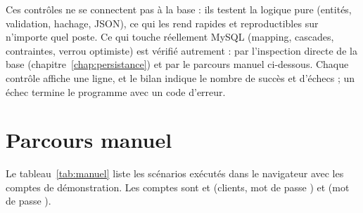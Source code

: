 Ces contrôles ne se connectent pas à la base : ils testent la logique pure (entités, validation, hachage, JSON), ce qui les rend
rapides et reproductibles sur n'importe quel poste. Ce qui touche réellement MySQL (mapping, cascades, contraintes, verrou optimiste) est
vérifié autrement : par l'inspection directe de la base (chapitre~\ref{chap:persistance}) et par le parcours manuel ci-dessous.
Chaque contrôle affiche une ligne, et le bilan indique le nombre de succès et d'échecs ; un échec termine le programme avec un code
d'erreur.


\section{Parcours manuel}
Le tableau~\ref{tab:manuel} liste les scénarios exécutés dans le navigateur avec les comptes de démonstration. Les comptes
sont  et  (clients, mot de passe ) et 
(mot de passe ).

